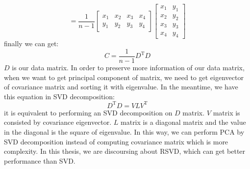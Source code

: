 \documentclass[11pt,a4paper]{article}
\begin{document}
\begin{equation}
    =\frac{1}{n-1}
        \begin{bmatrix}
        x_1 & x_2 & x_3 & x_4 \\
        y_1 & y_2 & y_3 & y_4
        \end{bmatrix}
        \begin{bmatrix}
        x_1 & y_1 \\
        x_2 & y_2 \\
        x_3 & y_3 \\
        x_4 & y_4
        \end{bmatrix}
\end{equation}
finally we can get:
\begin{equation}
    C=\frac{1}{n-1}D^\mathrm{T}D
\end{equation}
$D$ is our data matrix. In order to preserve more information of our data matrix, when we want to get principal component  of matrix,  we need to get eigenvector of covariance matrix and sorting it with eigenvalue. In the meantime, we have this equation in SVD decomposition:
\begin{equation}
    D^\mathrm{T}D=VLV^\mathrm{T}
\end{equation}
it is equivalent to performing an SVD decomposition on $D$ matrix. $V$ matrix is  consisted by covariance eigenvector. $L$ matrix is a diagonal matrix and the value in the diagonal is the square of eigenvalue. In this way, we can perform PCA by SVD decomposition instead of computing covariance matrix which is more complexity. In this thesis, we are discoursing about RSVD, which can get better performance than SVD. 
\end{document}
